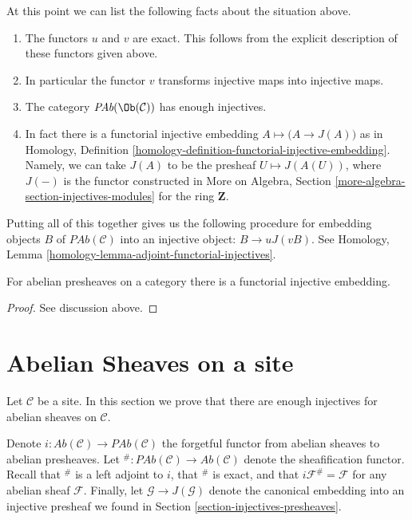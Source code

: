\medskip\noindent
At this point we can list the following facts
about the situation above.
\begin{enumerate}
\item The functors $u$ and $v$ are exact. This follows from
the explicit description of these functors given above.
\item In particular the functor $v$ transforms injective maps
into injective maps.
\item The category $\textit{PAb}(\Ob(\mathcal{C}))$
has enough injectives.
\item In fact there is a functorial injective embedding
$A \mapsto \big(A \to J(A)\big)$ as in
Homology, Definition \ref{homology-definition-functorial-injective-embedding}.
Namely, we can take $J(A)$ to be the
presheaf $U\mapsto J(A(U))$, where
$J(-)$ is the functor constructed in
More on Algebra, Section \ref{more-algebra-section-injectives-modules}
for the ring $\mathbf{Z}$.
\end{enumerate}
Putting all of this together gives us the following procedure
for embedding objects $B$ of $\textit{PAb}(\mathcal{C})$ into
an injective object: $B \to uJ(vB)$. See
Homology, Lemma \ref{homology-lemma-adjoint-functorial-injectives}.

\begin{proposition}
\label{proposition-presheaves-injectives}
For abelian presheaves on a category there is a functorial injective
embedding.
\end{proposition}

\begin{proof}
See discussion above.
\end{proof}












\section{Abelian Sheaves on a site}
\label{section-injectives-sheaves}

\noindent
Let $\mathcal{C}$ be a site. In this section we prove that there are
enough injectives for abelian sheaves on $\mathcal{C}$.

\medskip\noindent
Denote
$i : \textit{Ab}(\mathcal{C}) \longrightarrow \textit{PAb}(\mathcal{C})$
the forgetful functor from abelian sheaves to abelian presheaves.
Let
${}^\# : \textit{PAb}(\mathcal{C}) \longrightarrow \textit{Ab}(\mathcal{C})$
denote the sheafification functor. Recall that ${}^\#$ is a left adjoint
to $i$, that ${}^\#$ is exact, and that $i\mathcal{F}^\# = \mathcal{F}$
for any abelian sheaf $\mathcal{F}$. Finally, let
$\mathcal{G} \to J(\mathcal{G})$ denote the canonical
embedding into an injective presheaf we found in
Section \ref{section-injectives-presheaves}.

